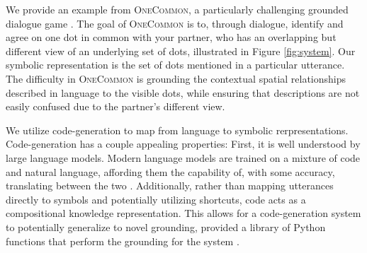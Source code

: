 \documentclass[11pt]{article}
\newcommand{\daniel}[1]{{{\textcolor{brown}{(Daniel: #1)}}}}
\begin{document}
We provide an example from \textsc{OneCommon}, 
a particularly challenging grounded dialogue game \citep{onecommon}.
The goal of \textsc{OneCommon} is to, through dialogue, identify and agree on one dot in common with your partner,
who has an overlapping but different view of an underlying set of dots, illustrated in Figure \ref{fig:system}.
Our symbolic representation is the set of dots mentioned in a particular utterance.
The difficulty in \textsc{OneCommon} is grounding the contextual spatial relationships described in language
to the visible dots, while ensuring that descriptions are not easily confused due to
the partner's different view.

We utilize code-generation to map from language to symbolic rerpresentations.
Code-generation has a couple appealing properties:
First, it is well understood by large language models.
Modern language models are trained on a mixture of code and natural language, affording them the capability of, with some accuracy, translating between the two \citep{chen2021evaluating}.
Additionally, rather than mapping utterances directly to symbols and potentially utilizing shortcuts,
code acts as a compositional knowledge representation.
This allows for a code-generation system to potentially generalize to novel grounding,
provided a library of Python functions that perform the grounding for the system \citep{codeaspolicies2022}.
\end{document}
